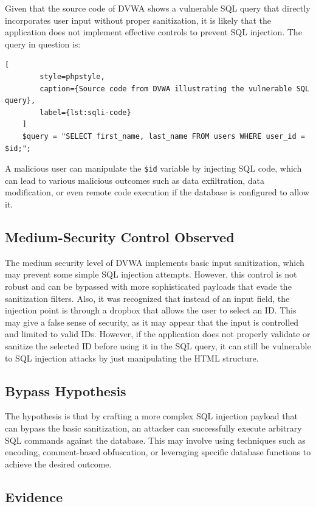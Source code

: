 \documentclass[11pt,a4paper]{report}
\begin{document}
    Given that the source code of DVWA shows a vulnerable SQL query that directly incorporates user input without proper sanitization, it is likely that the application does not implement effective controls to prevent SQL injection. The query in question is:

    \begin{lstlisting}[
        style=phpstyle,
        caption={Source code from DVWA illustrating the vulnerable SQL query},
        label={lst:sqli-code}
    ]
    $query = "SELECT first_name, last_name FROM users WHERE user_id = $id;";
    \end{lstlisting}

    A malicious user can manipulate the \texttt{\$id} variable by injecting SQL code, which can lead to various malicious outcomes such as data exfiltration, data modification, or even remote code execution if the database is configured to allow it.

    \subsection*{Medium-Security Control Observed}
    The medium security level of DVWA implements basic input sanitization, which may prevent some simple SQL injection attempts. However, this control is not robust and can be bypassed with more sophisticated payloads that evade the sanitization filters. 
    Also, it was recognized that instead of an input field, the injection point is through a dropbox that allows the user to select an ID. This may give a false sense of security, as it may appear that the input is controlled and limited to valid IDs. However, if the application does not properly validate or sanitize the selected ID before using it in the SQL query, it can still be vulnerable to SQL injection attacks by just manipulating the HTML structure.

    \subsection*{Bypass Hypothesis}
    The hypothesis is that by crafting a more complex SQL injection payload that can bypass the basic sanitization, an attacker can successfully execute arbitrary SQL commands against the database. This may involve using techniques such as encoding, comment-based obfuscation, or leveraging specific database functions to achieve the desired outcome.

    \subsection*{Evidence}
\end{document}
